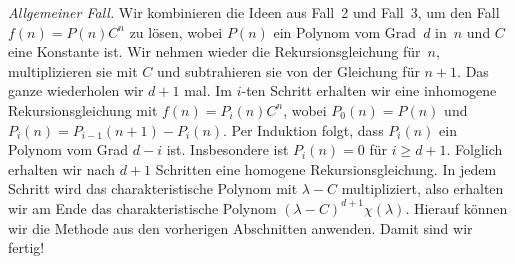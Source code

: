 \emph{Allgemeiner Fall.} Wir kombinieren die Ideen aus Fall~2 und Fall~3, um den Fall $f(n)=P(n)C^n$ zu lösen, wobei $P(n)$ ein Polynom vom Grad~$d$ in~$n$ und $C$ eine Konstante ist. Wir nehmen wieder die Rekursionsgleichung für~$n$, multiplizieren sie mit $C$ und subtrahieren sie von der Gleichung für $n+1$. Das ganze wiederholen wir $d+1$ mal. Im $i$-ten Schritt erhalten wir eine inhomogene Rekursionsgleichung mit $f(n)=P_i(n)C^n$, wobei $P_0(n)=P(n)$ und $P_i(n)=P_{i-1}(n+1)-P_i(n)$. Per Induktion folgt, dass $P_i(n)$ ein Polynom vom Grad $d-i$ ist. Insbesondere ist $P_i(n)=0$ für $i\geqslant d+1$. Folglich erhalten wir nach $d+1$ Schritten eine homogene Rekursionsgleichung. In jedem Schritt wird das charakteristische Polynom mit $\lambda-C$ multipliziert, also erhalten wir am Ende das charakteristische Polynom $(\lambda-C)^{d+1}\chi(\lambda)$. Hierauf können wir die Methode aus den vorherigen Abschnitten anwenden. Damit sind wir fertig!

